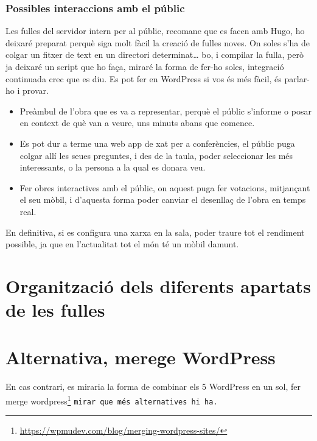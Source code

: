 \documentclass[
  10pt,
]{krantz}
\DeclareRobustCommand{\href}[2]{#2\footnote{\url{#1}}}
\begin{document}
\hypertarget{possibles-interaccions-amb-el-puxfablic}{%
\subsubsection{Possibles interaccions amb el públic}\label{possibles-interaccions-amb-el-puxfablic}}

Les fulles del servidor intern per al públic, recomane que es facen amb Hugo, ho deixaré preparat perquè siga molt fàcil la creació de fulles noves. On soles s'ha de colgar un fitxer de text en un directori determinat\ldots{} bo, i compilar la fulla, però ja deixaré un script que ho faça, miraré la forma de fer-ho soles, integració continuada crec que es diu. Es pot fer en WordPress si vos és més fàcil, és parlar-ho i provar.

\begin{itemize}
\item
  Preàmbul de l'obra que es va a representar, perquè el públic s'informe o posar en context de què van a veure, uns minuts abans que comence.
\item
  Es pot dur a terme una web app de xat per a conferències, el públic puga colgar allí les seues preguntes, i des de la taula, poder seleccionar les més interessants, o la persona a la qual es donara veu.
\item
  Fer obres interactives amb el públic, on aquest puga fer votacions, mitjançant el seu mòbil, i d'aquesta forma poder canviar el desenllaç de l'obra en temps real.
\end{itemize}

En definitiva, si es configura una xarxa en la sala, poder traure tot el rendiment possible, ja que en l'actualitat tot el món té un mòbil damunt.

\hypertarget{organitzaciuxf3-dels-diferents-apartats-de-les-fulles}{%
\section{Organització dels diferents apartats de les fulles}\label{organitzaciuxf3-dels-diferents-apartats-de-les-fulles}}

\hypertarget{alternativa-merege-wordpress}{%
\section{Alternativa, merege WordPress}\label{alternativa-merege-wordpress}}

En cas contrari, es miraria la forma de combinar els 5 WordPress en un sol, fer \href{https://wpmudev.com/blog/merging-wordpress-sites/}{merge wordpress} \texttt{mirar\ que\ més\ alternatives\ hi\ ha.}
\end{document}
